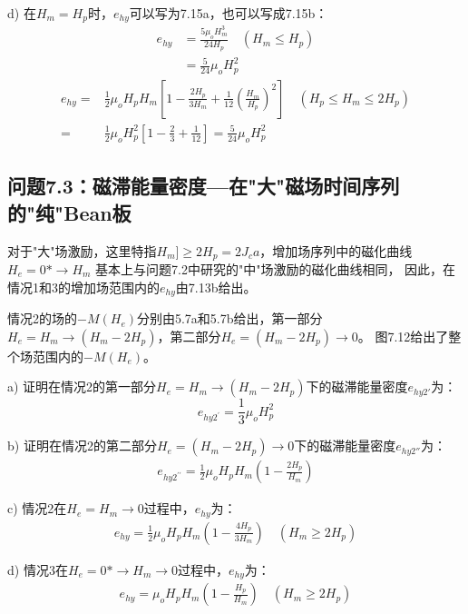 d) 在$H_m=H_p$时，$e_{hy}$可以写为7.15a，也可以写成7.15b：
\begin{align*}%
e_{hy}&=\frac{5\mu_oH_{m}^{3}}{24H_p} \quad (H_m\leq H_p) \\ \tag{71.5a}
&=\frac{5}{24}\mu_oH_{p}^{2}
\end{align*}
\begin{align*}%
e_{hy}=&\frac{1}{2}\mu_oH_pH_m\left[1-\frac{2H_p}{3H_m}+\frac{1}{12}\left(\frac{H_m}{H_p}\right)^2\right] \quad  (H_p\leq H_m\leq 2H_p) \\\tag{7.15b}
=&\frac{1}{2}\mu_oH_{p}^{2}\left[1-\frac{2}{3}+\frac{1}{12}\right]=\frac{5}{24}\mu_oH_{p}^{2}
\end{align*}


\subsection{问题7.3：磁滞能量密度---在"大"磁场时间序列的"纯"Bean板}
对于"大"场激励，这里特指$H_m]\ge 2H_p= 2J_c a$，增加场序列中的磁化曲线$H_e = 0*\rightarrow H_m$
基本上与问题7.2中研究的"中"场激励的磁化曲线相同， 因此，在情况1和3的增加场范围内的$e_{hy}$由7.13b给出。

情况2的场的$-M(H_e)$分别由5.7a和5.7b给出，第一部分$H_e = H_m\rightarrow (H_m-2H_p)$，第二部分$H_e=(H_m-2H_p)\rightarrow 0$。
图7.12给出了整个场范围内的$-M(H_e)$。

a) 证明在情况2的第一部分$H_e = H_m\rightarrow (H_m-2H_p)$下的磁滞能量密度$e_{hy2'}$为：
\begin{equation}%
e_{hy2^\prime}=\frac{1}{3}\mu_oH_{p}^{2}
\end{equation}

b) 证明在情况2的第二部分$H_e=(H_m-2H_p)\rightarrow 0$下的磁滞能量密度$e_{hy2''}$为：
\begin{align*}%
e_{hy2^{\prime\prime}}=\frac{1}{2}\mu_oH_pH_m\left(1-\frac{2H_p}{H_m}\right) \tag{7.16b}
\end{align*}

c) 情况2在$H_e=H_m\rightarrow 0$过程中，$e_{hy}$为：
\begin{align*}%
e_{hy}=\frac{1}{2}\mu_oH_pH_m\left(1-\frac{4H_p}{3H_m}\right)  \quad   (H_m\geq 2H_p) \tag{7.14b}
\end{align*}

d) 情况3在$H_e=0*\rightarrow H_m\rightarrow 0$过程中，$e_{hy}$为：
\begin{align*}%
e_{hy}=\mu_oH_pH_m\left(1-\frac{H_p}{H_m}\right) \quad   (H_m\geq 2H_p)
\end{align*}

